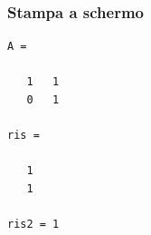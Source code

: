 \documentclass{book}
\begin{document}


\subsubsection{Stampa a schermo}
\label{sec:stauto}

\begin{verbatim}
A =

   1   1
   0   1

ris =

   1
   1

ris2 = 1
\end{verbatim}
\end{document}
